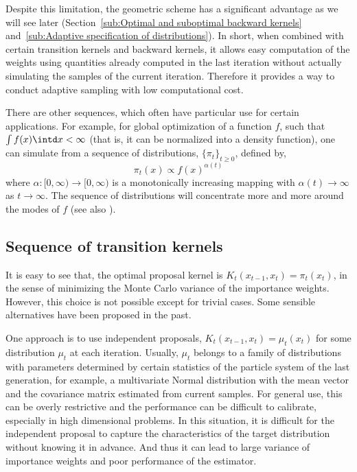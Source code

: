 Despite this limitation, the geometric scheme has a significant advantage as we will see later (Section~\ref{sub:Optimal and suboptimal backward kernels} and~\ref{sub:Adaptive specification of distributions}). In short, when combined with certain transition kernels and backward kernels, it allows easy computation of the weights using quantities already computed in the last iteration without actually simulating the samples of the current iteration. Therefore it provides a way to conduct adaptive sampling with low computational cost.

There are other sequences, which often have particular use for certain applications. For example, for global optimization of a function $f$, such that $\int f(x)\intd x <\infty$ (that is, it can be normalized into a density function), one can simulate from a sequence of distributions, $\{\pi_t\}_{t\ge0}$, defined by,
\begin{equation}
  \pi_t(x) \propto f(x)^{\alpha(t)}
\end{equation}
where $\alpha: [0,\infty) \to [0,\infty)$ is a monotonically increasing mapping with $\alpha(t) \to \infty$ as $t \to \infty$. The sequence of distributions will concentrate more and more around the modes of $f$ (see also \cite{Marinari:1992vx}).

\subsection{Sequence of transition kernels}
\label{sub:Sequence of transition kernels}

It is easy to see that, the optimal proposal kernel is $K_t(x_{t-1}, x_t) = \pi_t(x_t)$, in the sense of minimizing the Monte Carlo variance of the importance weights. However, this choice is not possible except for trivial cases. Some sensible alternatives have been proposed in the past.

One approach is to use independent proposals, $K_t(x_{t-1}, x_t) = \mu_t(x_t)$ for some distribution $\mu_t$ at each iteration. Usually, $\mu_t$ belongs to a family of distributions with parameters determined by certain statistics of the particle system of the last generation, for example, a multivariate Normal distribution with the mean vector and the covariance matrix estimated from current samples. For general use, this can be overly restrictive and the performance can be difficult to calibrate, especially in high dimensional problems. In this situation, it is difficult for the independent proposal to capture the characteristics of the target distribution without knowing it in advance. And thus it can lead to large variance of importance weights and poor performance of the estimator.

